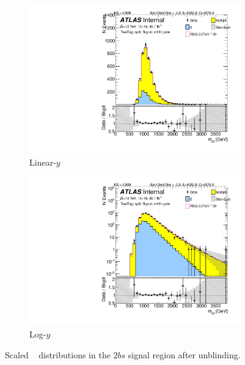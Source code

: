 \begin{figure}[htb!]
\begin{center}
    \captionsetup{justification=centering}
    \begin{subfigure}[b]{0.45\textwidth}
        \includegraphics[width=\textwidth,angle=-90]{figures/boosted/Signal_Syst/Moriond_bkg_9_TwoTag_split_Signal_mHH_pole.pdf}
        \caption{Linear-$y$}
        \label{fig:boosted-2b-signal-pole-lin}
    \end{subfigure}
    \quad
    \begin{subfigure}[b]{0.45\textwidth}
        \includegraphics[width=\textwidth,angle=-90]{figures/boosted/Signal_Syst/Moriond_bkg_9_TwoTag_split_Signal_mHH_pole_1.pdf}
        \caption{Log-$y$}
        \label{fig:boosted-2b-signal-pole-log}
    \end{subfigure}
  \caption{Scaled \mtwoJ~ distributions in the $2bs$ signal region after unblinding.}
  \label{fig:boosted-2b-signal-pole}
\end{center}
\end{figure}

